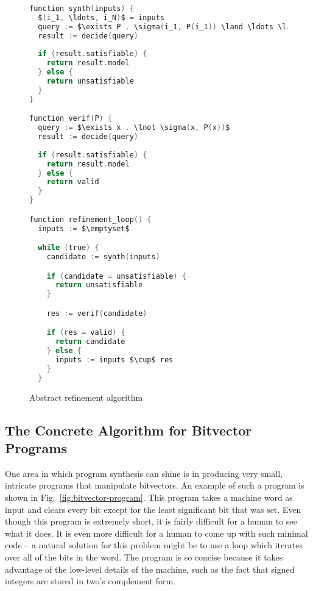 \documentclass[a4paper]{llncs}
\begin{document}
\begin{figure}
\centering
\begin{minipage}{0.9\textwidth}
 \begin{lstlisting}[mathescape,language=C,morekeywords={function}]
function synth(inputs) {
  $(i_1, \ldots, i_N)$ = inputs
  query := $\exists P . \sigma(i_1, P(i_1)) \land \ldots \land \sigma(i_N, P(i_N))$
  result := decide(query)
  
  if (result.satisfiable) {
    return result.model
  } else {
    return unsatisfiable
  }
}

function verif(P) {
  query := $\exists x . \lnot \sigma(x, P(x))$
  result := decide(query)
  
  if (result.satisfiable) {
    return result.model
  } else {
    return valid
  }
}

function refinement_loop() {
  inputs := $\emptyset$

  while (true) {
    candidate := synth(inputs)

    if (candidate = unsatisfiable) {
      return unsatisfiable
    }

    res := verif(candidate)

    if (res = valid) {
      return candidate
    } else {
      inputs := inputs $\cup$ res
    }
  }
 \end{lstlisting}
 \end{minipage}
 

 \caption{Abstract refinement algorithm
 \label{fig:abstract-refinement-code}}
\end{figure}

\subsection{The Concrete Algorithm for Bitvector Programs}

One area in which program synthesis can shine is in producing very small,
intricate programs that manipulate bitvectors.  An example of such a program
is shown in Fig.~\ref{fig:bitvector-program}.  This program takes a machine word
as input and clears every bit except for the least significant bit that was set.
Even though this program is extremely short, it is fairly difficult for a human
to see what it does.  It is even more difficult for a human to come up with such
minimal code -- a natural solution for this problem might be to use a loop which
iterates over all of the bits in the word.  The program is so concise because it
takes advantage of the low-level details of the machine, such as the fact that
signed integers are stored in two's complement form.
\end{document}
